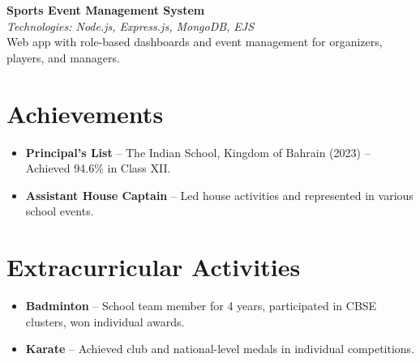 \documentclass[11pt,a4paper]{article}
\begin{document}
\noindent %
\textbf{Sports Event Management System} \\
\textit{Technologies: Node.js, Express.js, MongoDB, EJS} \\
Web app with role-based dashboards and event management for organizers, players, and managers.

\section*{Achievements}
\begin{itemize}
    \item \textbf{Principal's List} – The Indian School, Kingdom of Bahrain (2023) – Achieved 94.6\% in Class XII.
    \item \textbf{Assistant House Captain} – Led house activities and represented in various school events.
\end{itemize}

\section*{Extracurricular Activities}
\begin{itemize}
    \item \textbf{Badminton} – School team member for 4 years, participated in CBSE clusters, won individual awards.
    \item \textbf{Karate} – Achieved club and national-level medals in individual competitions.
\end{itemize}
\end{document}
